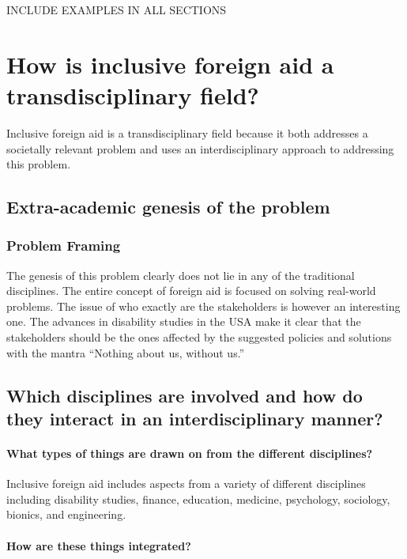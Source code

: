 \documentclass[a4paper]{article}
\begin{document}
INCLUDE EXAMPLES IN ALL SECTIONS

\section{How is inclusive foreign aid a transdisciplinary field?}

Inclusive foreign aid is a transdisciplinary field because it both addresses a
societally relevant problem and uses an interdisciplinary approach to
addressing this problem. 

\subsection{Extra-academic genesis of the problem}

\subsubsection{Problem Framing}

The genesis of this problem clearly does not lie in any of the traditional
disciplines. The entire concept of foreign aid is focused on solving
real-world problems. The issue of who exactly are the stakeholders is however
an interesting one. The advances in disability studies in the USA make it
clear that the stakeholders should be the ones affected by the suggested
policies and solutions with the mantra ``Nothing about us, without us.''



\subsection{Which disciplines are involved and how do they interact in an
interdisciplinary manner?}

\paragraph{What types of things are drawn on from the different disciplines?}

Inclusive foreign aid includes aspects from a variety of different disciplines
including disability studies, finance, education, medicine, psychology,
sociology, bionics, and engineering. 

\paragraph{How are these things integrated?}
\end{document}
